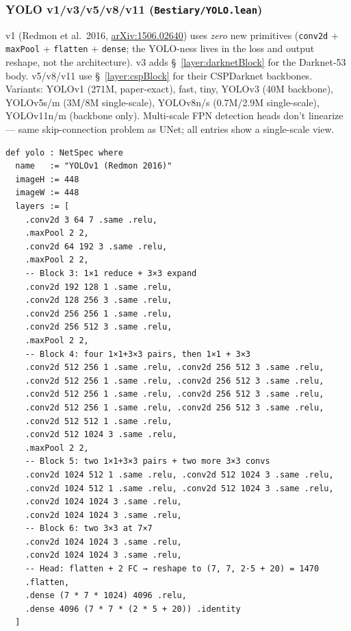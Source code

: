 \subsubsection*{YOLO v1/v3/v5/v8/v11 (\texttt{Bestiary/YOLO.lean})}
v1 (Redmon et al.\ 2016,
\href{https://arxiv.org/abs/1506.02640}{arXiv:1506.02640}) uses
\emph{zero} new primitives (\texttt{conv2d} + \texttt{maxPool} +
\texttt{flatten} + \texttt{dense}; the YOLO-ness lives in the loss and
output reshape, not the architecture). v3 adds \S~\ref{layer:darknetBlock}
for the Darknet-53 body. v5/v8/v11 use \S~\ref{layer:cspBlock} for
their CSPDarknet backbones. Variants: YOLOv1 (271M, paper-exact), fast,
tiny, YOLOv3 (40M backbone), YOLOv5s/m (3M/8M single-scale), YOLOv8n/s
(0.7M/2.9M single-scale), YOLOv11n/m (backbone only). Multi-scale FPN
detection heads don't linearize --- same skip-connection problem as
UNet; all entries show a single-scale view.

\begin{verbatim}
def yolo : NetSpec where
  name   := "YOLOv1 (Redmon 2016)"
  imageH := 448
  imageW := 448
  layers := [
    .conv2d 3 64 7 .same .relu,
    .maxPool 2 2,
    .conv2d 64 192 3 .same .relu,
    .maxPool 2 2,
    -- Block 3: 1×1 reduce + 3×3 expand
    .conv2d 192 128 1 .same .relu,
    .conv2d 128 256 3 .same .relu,
    .conv2d 256 256 1 .same .relu,
    .conv2d 256 512 3 .same .relu,
    .maxPool 2 2,
    -- Block 4: four 1×1+3×3 pairs, then 1×1 + 3×3
    .conv2d 512 256 1 .same .relu, .conv2d 256 512 3 .same .relu,
    .conv2d 512 256 1 .same .relu, .conv2d 256 512 3 .same .relu,
    .conv2d 512 256 1 .same .relu, .conv2d 256 512 3 .same .relu,
    .conv2d 512 256 1 .same .relu, .conv2d 256 512 3 .same .relu,
    .conv2d 512 512 1 .same .relu,
    .conv2d 512 1024 3 .same .relu,
    .maxPool 2 2,
    -- Block 5: two 1×1+3×3 pairs + two more 3×3 convs
    .conv2d 1024 512 1 .same .relu, .conv2d 512 1024 3 .same .relu,
    .conv2d 1024 512 1 .same .relu, .conv2d 512 1024 3 .same .relu,
    .conv2d 1024 1024 3 .same .relu,
    .conv2d 1024 1024 3 .same .relu,
    -- Block 6: two 3×3 at 7×7
    .conv2d 1024 1024 3 .same .relu,
    .conv2d 1024 1024 3 .same .relu,
    -- Head: flatten + 2 FC → reshape to (7, 7, 2·5 + 20) = 1470
    .flatten,
    .dense (7 * 7 * 1024) 4096 .relu,
    .dense 4096 (7 * 7 * (2 * 5 + 20)) .identity
  ]
\end{verbatim}

